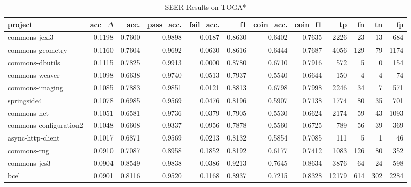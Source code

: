 \begin{table*}
\centering
\caption{SEER Results on TOGA*}
\label{tab:toga_results_all}
\begin{tabular}{lrrrrrrrrrrr}
\toprule
                project &  acc\_$\Delta$ &    acc. &  pass\_acc. &  fail\_acc. &      f1 &  coin\_acc. &  coin\_f1 &      tp &    fn &    tn &     fp \\
\midrule
          commons-jexl3 &      0.1198 &  0.7600 &     0.9898 &     0.0187 &  0.8630 &     0.6402 &   0.7635 &    2226 &    23 &    13 &    684 \\
       commons-geometry &      0.1160 &  0.7604 &     0.9692 &     0.0630 &  0.8616 &     0.6444 &   0.7687 &    4056 &   129 &    79 &   1174 \\
        commons-dbutils &      0.1115 &  0.7825 &     0.9913 &     0.0000 &  0.8780 &     0.6710 &   0.7916 &     572 &     5 &     0 &    154 \\
         commons-weaver &      0.1098 &  0.6638 &     0.9740 &     0.0513 &  0.7937 &     0.5540 &   0.6644 &     150 &     4 &     4 &     74 \\
        commons-imaging &      0.1085 &  0.7883 &     0.9851 &     0.0121 &  0.8813 &     0.6798 &   0.7998 &    2246 &    34 &     7 &    571 \\
            springside4 &      0.1078 &  0.6985 &     0.9569 &     0.0476 &  0.8196 &     0.5907 &   0.7138 &    1774 &    80 &    35 &    701 \\
            commons-net &      0.1051 &  0.6581 &     0.9736 &     0.0379 &  0.7905 &     0.5530 &   0.6624 &    2174 &    59 &    43 &   1093 \\
 commons-configuration2 &      0.1048 &  0.6608 &     0.9337 &     0.0956 &  0.7878 &     0.5560 &   0.6725 &     789 &    56 &    39 &    369 \\
      async-http-client &      0.1017 &  0.6871 &     0.9569 &     0.0213 &  0.8132 &     0.5854 &   0.7085 &     111 &     5 &     1 &     46 \\
            commons-rng &      0.0910 &  0.7087 &     0.8958 &     0.1852 &  0.8192 &     0.6177 &   0.7412 &    1083 &   126 &    80 &    352 \\
           commons-jcs3 &      0.0904 &  0.8549 &     0.9838 &     0.0386 &  0.9213 &     0.7645 &   0.8634 &    3876 &    64 &    24 &    598 \\
                   bcel &      0.0901 &  0.8116 &     0.9520 &     0.1168 &  0.8937 &     0.7215 &   0.8328 &   12179 &   614 &   302 &   2284 \\

\end{tabular}
\end{table*}
